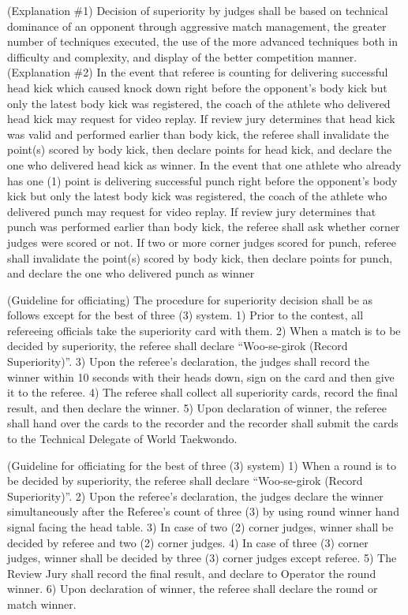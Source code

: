 \documentclass[
]{report}
\begin{document}
(Explanation \#1) Decision of superiority by judges shall be based on
technical dominance of an opponent through aggressive match management,
the greater number of techniques executed, the use of the more advanced
techniques both in difficulty and complexity, and display of the better
competition manner. (Explanation \#2) In the event that referee is
counting for delivering successful head kick which caused knock down
right before the opponent's body kick but only the latest body kick was
registered, the coach of the athlete who delivered head kick may request
for video replay. If review jury determines that head kick was valid and
performed earlier than body kick, the referee shall invalidate the
point(s) scored by body kick, then declare points for head kick, and
declare the one who delivered head kick as winner. In the event that one
athlete who already has one (1) point is delivering successful punch
right before the opponent's body kick but only the latest body kick was
registered, the coach of the athlete who delivered punch may request for
video replay. If review jury determines that punch was performed earlier
than body kick, the referee shall ask whether corner judges were scored
or not. If two or more corner judges scored for punch, referee shall
invalidate the point(s) scored by body kick, then declare points for
punch, and declare the one who delivered punch as winner

(Guideline for officiating) The procedure for superiority decision shall
be as follows except for the best of three (3) system. 1) Prior to the
contest, all refereeing officials take the superiority card with them.
2) When a match is to be decided by superiority, the referee shall
declare ``Woo-se-girok (Record Superiority)''. 3) Upon the referee's
declaration, the judges shall record the winner within 10 seconds with
their heads down, sign on the card and then give it to the referee. 4)
The referee shall collect all superiority cards, record the final
result, and then declare the winner. 5) Upon declaration of winner, the
referee shall hand over the cards to the recorder and the recorder shall
submit the cards to the Technical Delegate of World Taekwondo.

(Guideline for officiating for the best of three (3) system) 1) When a
round is to be decided by superiority, the referee shall declare
``Woo-se-girok (Record Superiority)''. 2) Upon the referee's
declaration, the judges declare the winner simultaneously after the
Referee's count of three (3) by using round winner hand signal facing
the head table. 3) In case of two (2) corner judges, winner shall be
decided by referee and two (2) corner judges. 4) In case of three (3)
corner judges, winner shall be decided by three (3) corner judges except
referee. 5) The Review Jury shall record the final result, and declare
to Operator the round winner. 6) Upon declaration of winner, the referee
shall declare the round or match winner.
\end{document}
